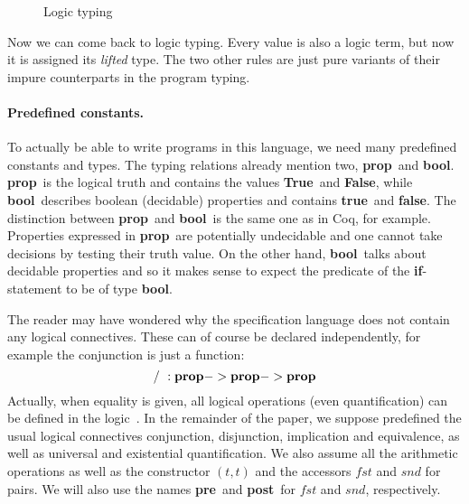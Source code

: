 \documentclass[a4paper]{llncs}
\newcommand{\letml}{{\bf let}}
\newcommand{\inml}{{\bf in}}
\newcommand{\ifml}{{\bf if}}
\newcommand{\thenml}{{\bf then}}
\newcommand{\elseml}{{\bf else}}
\newcommand{\preml}{{\bf pre}}
\newcommand{\postml}{{\bf post}}
\newcommand{\propml}{{\bf prop}}
\newcommand{\boolml}{{\bf bool}}
\newcommand{\alist}[1]{\overline{#1} }
\newcommand{\Trueml}{{\bf True}}
\newcommand{\Falseml}{{\bf False}}
\newcommand{\trueml}{{\bf true}}
\newcommand{\falseml}{{\bf false}}
\newcommand{\coq}{Coq}
\newcommand{\ceil}[1]{\lceil #1 \rceil}
\begin{document}
\begin{figure}[tbp]
  \caption{Logic typing}
  \label{fig:logictyping}
\end{figure}

Now we can come back to logic typing. Every value is also a logic term,
but now it is assigned its {\em lifted} type. The two other rules are just 
pure variants of their impure counterparts in the program typing.

\paragraph{Predefined constants.}

To actually be able to write programs in this language, we need many
predefined constants and types. The typing relations already mention two,
\propml\ and \boolml. \propml\ is the logical truth and contains the values
\Trueml\ and \Falseml, while \boolml\ describes boolean (decidable) properties
and contains \trueml\ and \falseml. The distinction between \propml\ and
\boolml\ is the same one as in \coq, for example. Properties expressed in
\propml\ are potentially undecidable and one cannot take decisions by testing
their truth value. On the other hand, \boolml\ talks about decidable
properties and so it makes sense to expect the predicate of the
\ifml-statement to be of type \boolml.

The reader may have wondered why the specification language does not contain
any logical connectives. These can of course be declared independently, for
example the conjunction is just a function: 
\begin{equation*} 
  /\ :  \propml -> \propml -> \propml 
\end{equation*} 
Actually, when equality is given, all logical operations (even quantification)
can be defined in the logic~\cite{andrews86}.  In the remainder of the paper,
we suppose predefined the usual logical connectives conjunction, disjunction,
implication and equivalence, as well as universal and existential
quantification. We also assume all the arithmetic operations as well as the
constructor $(t,t)$  and the accessors $\mathit{fst}$ and $\mathit{snd}$ for
pairs. We will also use the names \preml\ and \postml\ for $\mathit{fst}$ and
$\mathit{snd}$, respectively.
\end{document}
